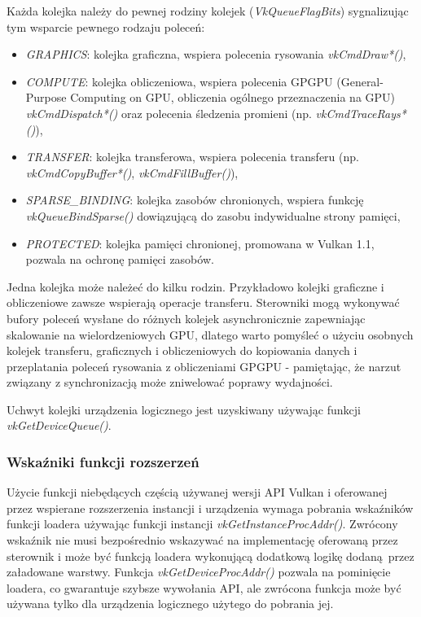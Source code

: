 Każda kolejka należy do pewnej rodziny kolejek (\textit{VkQueueFlagBits}) sygnalizując tym wsparcie pewnego rodzaju poleceń:
\begin{itemize}
	\item \textit{GRAPHICS}: kolejka graficzna, wspiera polecenia rysowania \textit{vkCmdDraw*()},
	\item \textit{COMPUTE}: kolejka obliczeniowa, wspiera polecenia GPGPU (General-Purpose Computing on GPU, obliczenia ogólnego przeznaczenia na GPU) \textit{vkCmdDispatch*()} oraz polecenia śledzenia promieni (np. \textit{vkCmdTraceRays*()}),
	\item \textit{TRANSFER}: kolejka transferowa, wspiera polecenia transferu (np. \textit{vkCmdCopyBuffer*()}, \textit{vkCmdFillBuffer()}),
	\item \textit{SPARSE\_BINDING}: kolejka zasobów chronionych, wspiera funkcję \textit{vkQueueBindSparse()} dowiązującą do zasobu indywidualne strony pamięci,
	\item \textit{PROTECTED}: kolejka pamięci chronionej, promowana w Vulkan 1.1, pozwala na ochronę pamięci zasobów.
\end{itemize}
Jedna kolejka może należeć do kilku rodzin. Przykładowo kolejki graficzne i obliczeniowe zawsze wspierają operacje transferu.
Sterowniki mogą wykonywać bufory poleceń wysłane do różnych kolejek asynchronicznie zapewniając skalowanie na wielordzeniowych GPU, dlatego warto pomyśleć o użyciu osobnych kolejek transferu, graficznych i obliczeniowych do kopiowania danych i przeplatania poleceń rysowania z obliczeniami GPGPU - pamiętając, że narzut związany z synchronizacją może zniwelować poprawy wydajności.

Uchwyt kolejki urządzenia logicznego jest uzyskiwany używając funkcji \textit{vkGetDeviceQueue()}.


\subsubsection{Wskaźniki funkcji rozszerzeń}

Użycie funkcji niebędących częścią używanej wersji API Vulkan i oferowanej przez wspierane rozszerzenia instancji i urządzenia wymaga pobrania wskaźników funkcji loadera używając funkcji instancji \textit{vkGetInstanceProcAddr()}.
Zwrócony wskaźnik nie musi bezpośrednio wskazywać na implementację oferowaną przez sterownik i może być funkcją loadera wykonującą dodatkową logikę dodaną przez załadowane warstwy.
Funkcja \textit{vkGetDeviceProcAddr()} pozwala na pominięcie loadera, co gwarantuje szybsze wywołania API, ale zwrócona funkcja może być używana tylko dla urządzenia logicznego użytego do pobrania jej.

